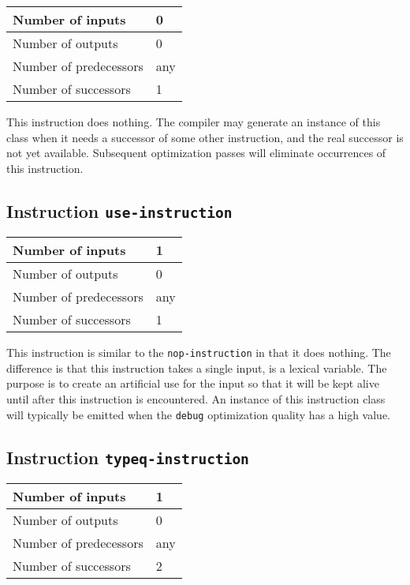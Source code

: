 \begin{tabular}{|l|l|}
\hline
Number of inputs &  0\\
\hline
Number of outputs & 0\\
\hline
Number of predecessors & any\\
\hline
Number of successors & 1\\
\hline
\end{tabular}

This instruction does nothing.  The compiler may generate an instance
of this class when it needs a successor of some other instruction, and
the real successor is not yet available.  Subsequent optimization
passes will eliminate occurrences of this instruction.

\subsection{Instruction \texttt{use-instruction}}
\label{mir-instruction-use}

\begin{tabular}{|l|l|}
\hline
Number of inputs &  1\\
\hline
Number of outputs & 0\\
\hline
Number of predecessors & any\\
\hline
Number of successors & 1\\
\hline
\end{tabular}

This instruction is similar to the \texttt{nop-instruction} in that it
does nothing.  The difference is that this instruction takes a single
input, is a lexical variable.  The purpose is to create an artificial
use for the input so that it will be kept alive until after this
instruction is encountered.  An instance of this instruction class
will typically be emitted when the \texttt{debug} optimization quality has a high value.

\subsection{Instruction \texttt{typeq-instruction}}
\label{mir-instruction-typeq}

\begin{tabular}{|l|l|}
\hline
Number of inputs & 1\\
\hline
Number of outputs & 0\\
\hline
Number of predecessors & any\\
\hline
Number of successors & 2\\
\hline
\end{tabular}

